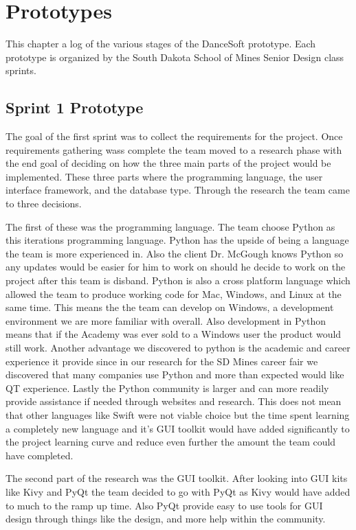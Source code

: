 
\chapter{Prototypes}

This chapter a log of the various stages of the DanceSoft prototype. Each prototype is organized by the South Dakota School of Mines Senior Design class sprints.   

\section{Sprint 1 Prototype}

The goal of the first sprint was to collect the requirements for the project. Once requirements gathering wass complete the team moved to a research phase with the end goal of deciding on how the three main parts of the project would be implemented. These three parts where the programming language, the user interface framework, and the database type. Through the research the team came to three decisions.

The first of these was the programming language. The team choose Python as this iterations programming language. Python has the upside of being a language the team is more experienced in. Also the client Dr. McGough knows Python so any updates would be easier for him to work on should he decide to work on the project after this team is disband. Python is also a cross platform language which allowed the team to produce working code for Mac, Windows, and Linux at the same time. This means the the team can develop on Windows, a development environment we are more familiar with overall. Also development in Python means that if the Academy was ever sold to a Windows user the product would still work. Another advantage we discovered to python is the academic and career experience it provide since in our research for the SD Mines career fair we discovered that many companies use Python and more than expected would like QT experience. Lastly the Python community is larger and can more readily provide assistance if needed through websites and research. This does not mean that other languages like Swift were not viable choice but the time spent learning a completely new language and it's GUI toolkit would have added significantly to the project learning curve and reduce even further the amount the team could have completed.

The second part of the research was the GUI toolkit. After looking into GUI kits like Kivy and PyQt the team decided to go with PyQt as Kivy would have added to much to the ramp up time. Also PyQt provide easy to use tools for GUI design through things like the design, and more help within the community.


